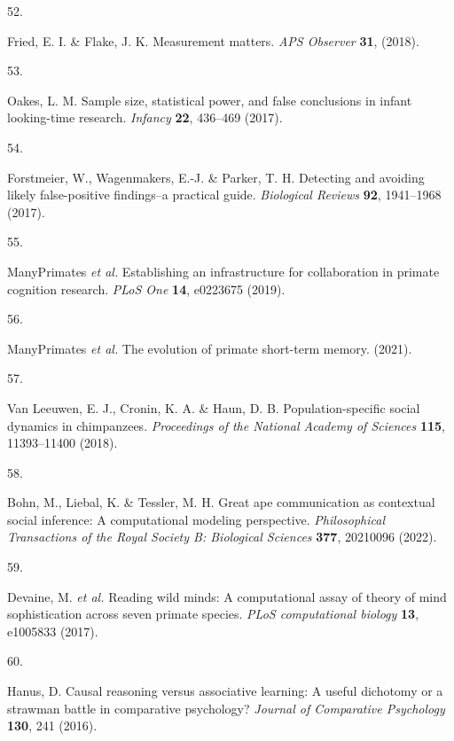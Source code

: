 \documentclass[
  man,floatsintext]{apa6}
\newlength{\cslhangindent}
\newlength{\csllabelwidth}
\newlength{\cslentryspacingunit} %
\newenvironment{CSLReferences}[2] %
 {%
  \setlength{\parindent}{0pt}
  \ifodd #1
  \let\oldpar\par
  \def\par{\hangindent=\cslhangindent\oldpar}
  \fi
  \setlength{\parskip}{#2\cslentryspacingunit}
 }%
 {}
\newcommand{\CSLLeftMargin}[1]{\parbox[t]{\csllabelwidth}{#1}}
\newcommand{\CSLRightInline}[1]{\parbox[t]{\linewidth - \csllabelwidth}{#1}\break}
\begin{document}
\begin{CSLReferences}{0}{0}
\leavevmode{}%
\CSLLeftMargin{52. }%
\CSLRightInline{Fried, E. I. \& Flake, J. K. Measurement matters. \emph{APS Observer} \textbf{31}, (2018).}

\leavevmode{}%
\CSLLeftMargin{53. }%
\CSLRightInline{Oakes, L. M. Sample size, statistical power, and false conclusions in infant looking-time research. \emph{Infancy} \textbf{22}, 436--469 (2017).}

\leavevmode{}%
\CSLLeftMargin{54. }%
\CSLRightInline{Forstmeier, W., Wagenmakers, E.-J. \& Parker, T. H. Detecting and avoiding likely false-positive findings--a practical guide. \emph{Biological Reviews} \textbf{92}, 1941--1968 (2017).}

\leavevmode{}%
\CSLLeftMargin{55. }%
\CSLRightInline{ManyPrimates \emph{et al.} Establishing an infrastructure for collaboration in primate cognition research. \emph{PLoS One} \textbf{14}, e0223675 (2019).}

\leavevmode{}%
\CSLLeftMargin{56. }%
\CSLRightInline{ManyPrimates \emph{et al.} The evolution of primate short-term memory. (2021).}

\leavevmode{}%
\CSLLeftMargin{57. }%
\CSLRightInline{Van Leeuwen, E. J., Cronin, K. A. \& Haun, D. B. Population-specific social dynamics in chimpanzees. \emph{Proceedings of the National Academy of Sciences} \textbf{115}, 11393--11400 (2018).}

\leavevmode{}%
\CSLLeftMargin{58. }%
\CSLRightInline{Bohn, M., Liebal, K. \& Tessler, M. H. Great ape communication as contextual social inference: A computational modeling perspective. \emph{Philosophical Transactions of the Royal Society B: Biological Sciences} \textbf{377}, 20210096 (2022).}

\leavevmode{}%
\CSLLeftMargin{59. }%
\CSLRightInline{Devaine, M. \emph{et al.} Reading wild minds: A computational assay of theory of mind sophistication across seven primate species. \emph{PLoS computational biology} \textbf{13}, e1005833 (2017).}

\leavevmode{}%
\CSLLeftMargin{60. }%
\CSLRightInline{Hanus, D. Causal reasoning versus associative learning: A useful dichotomy or a strawman battle in comparative psychology? \emph{Journal of Comparative Psychology} \textbf{130}, 241 (2016).}


\end{CSLReferences}
\end{document}
